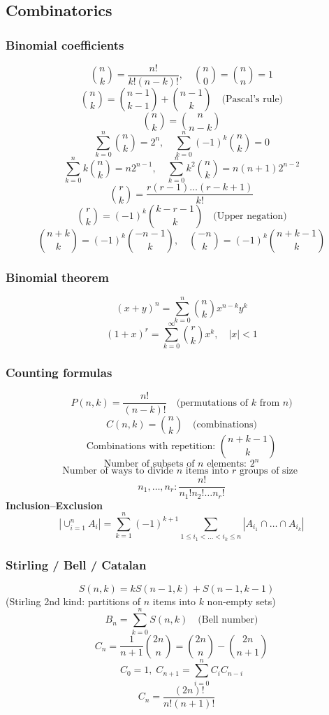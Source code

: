 \subsection{Combinatorics}

\subsubsection*{Binomial coefficients}
\[
\binom{n}{k} = \frac{n!}{k!(n-k)!}, \quad \binom{n}{0} = \binom{n}{n} = 1
\]
\[
\binom{n}{k} = \binom{n-1}{k-1} + \binom{n-1}{k} \quad \text{(Pascal's rule)}
\]
\[
\binom{n}{k} = \binom{n}{n-k}
\]
\[
\sum_{k=0}^{n} \binom{n}{k} = 2^n, \quad \sum_{k=0}^{n} (-1)^k \binom{n}{k} = 0
\]
\[
\sum_{k=0}^{n} k\binom{n}{k} = n2^{n-1}, \quad \sum_{k=0}^{n} k^2\binom{n}{k} = n(n+1)2^{n-2}
\]
\[
\binom{r}{k} = \frac{r(r-1)\dots(r-k+1)}{k!}
\]
\[
\binom{r}{k} = (-1)^k \binom{k-r-1}{k} \quad \text{(Upper negation)}
\]
\[
\binom{n+k}{k} = (-1)^k \binom{-n-1}{k}, \quad \binom{-n}{k} = (-1)^k \binom{n+k-1}{k}
\]

\subsubsection*{Binomial theorem}
\[
(x+y)^n = \sum_{k=0}^{n} \binom{n}{k} x^{n-k} y^k
\]
\[
(1+x)^r = \sum_{k=0}^{\infty} \binom{r}{k} x^k, \quad |x|<1
\]

\subsubsection*{Counting formulas}
\[
P(n,k) = \frac{n!}{(n-k)!} \quad \text{(permutations of $k$ from $n$)}
\]
\[
C(n,k) = \binom{n}{k} \quad \text{(combinations)}
\]
\[
\text{Combinations with repetition: } \binom{n+k-1}{k}
\]
\[
\text{Number of subsets of } n \text{ elements: } 2^n
\]
\[
\text{Number of ways to divide } n \text{ items into } r \text{ groups of size } 
\]
\[
n_1,\dots,n_r: \frac{n!}{n_1!n_2!\dots n_r!}
\]
\textbf{Inclusion–Exclusion}
\[
|\cup_{i=1}^n A_i| = \sum_{k=1}^n (-1)^{k+1} \!\!\! \sum_{1 \le i_1 < \dots < i_k \le n}\!\! |A_{i_1} \cap \dots \cap A_{i_k}|
\]

\subsubsection*{Stirling / Bell / Catalan}
\[
S(n,k) = kS(n-1,k) + S(n-1,k-1) \quad 
\]
(Stirling 2nd kind: partitions of $n$ items into $k$ non-empty sets)
\[
B_n = \sum_{k=0}^n S(n,k) \quad \text{(Bell number)}
\]
\[
C_n = \frac{1}{n+1}\binom{2n}{n} = \binom{2n}{n} - \binom{2n}{n+1}
\]
\[
C_0 = 1,\; C_{n+1} = \sum_{i=0}^{n} C_i C_{n-i}
\]
\[
C_n = \frac{(2n)!}{n!(n+1)!} \quad \]

